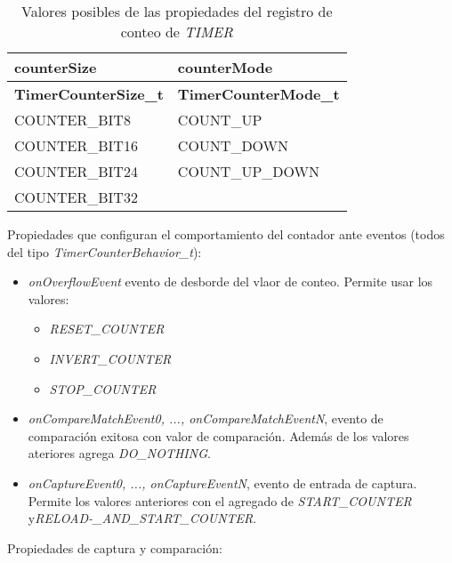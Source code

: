 \begin{table}[h]
	\centering	
	\begin{tabular}{l l}   
		\toprule
		\textbf{counterSize} & \textbf{counterMode} \\
		\midrule
		\textbf{TimerCounterSize\_t} & \textbf{TimerCounterMode\_t} \\
		\midrule
      COUNTER\_BIT8  & COUNT\_UP       \\
      COUNTER\_BIT16 & COUNT\_DOWN     \\
      COUNTER\_BIT24 & COUNT\_UP\_DOWN \\
      COUNTER\_BIT32 &                 \\
		\bottomrule
		\hline
	\end{tabular}
	\caption[Valores posibles de las propiedades del registro de conteo de \emph{TIMER}]{Valores posibles de las propiedades del registro de conteo de \emph{TIMER}}
	\label{tab:PropRegConteoTimer}
\end{table}

\pagebreak

Propiedades que configuran el comportamiento del contador ante eventos (todos del tipo \emph{TimerCounterBehavior\_t}):  

\begin{itemize}
\item
\emph{onOverflowEvent} evento de desborde del vlaor de conteo. Permite usar los valores:
\begin{itemize}
\item \emph{RESET\_COUNTER}
\item \emph{INVERT\_COUNTER}
\item \emph{STOP\_COUNTER}
\end{itemize}
\item
\emph{onCompareMatchEvent0, ..., onCompareMatchEventN}, evento de comparación exitosa con valor de comparación. Además de los valores ateriores agrega \emph{DO\_NOTHING}.
\item
\emph{onCaptureEvent0, ..., onCaptureEventN}, evento de entrada de captura. Permite los valores anteriores con el agregado de \emph{START\_COUNTER} y\emph{RELOAD-\_AND\_START\_COUNTER}.
\end{itemize}

Propiedades de captura y comparación:


